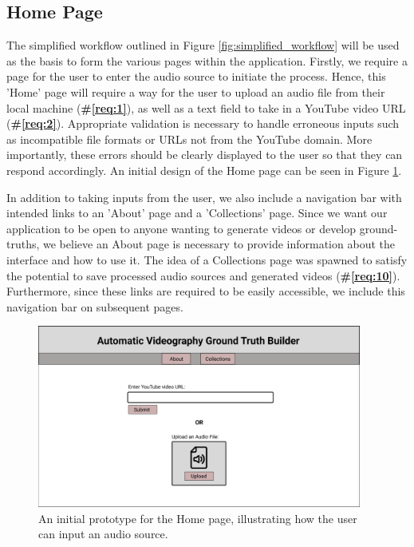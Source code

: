 \documentclass{l4proj}
\begin{document}
\subsection{Home Page}
The simplified workflow outlined in Figure \ref{fig:simplified_workflow} will be used as the basis to form the various pages within the application. Firstly, we require a page for the user to enter the audio source to initiate the process. Hence, this 'Home' page will require a way for the user to upload an audio file from their local machine (\textbf{\#\ref{req:1}}), as well as a text field to take in a YouTube video URL (\textbf{\#\ref{req:2}}). Appropriate validation is necessary to handle erroneous inputs such as incompatible file formats or URLs not from the YouTube domain. More importantly, these errors should be clearly displayed to the user so that they can respond accordingly. An initial design of the Home page can be seen in Figure \ref{fig:home_page}. 

In addition to taking inputs from the user, we also include a navigation bar with intended links to an 'About' page and a 'Collections' page. Since we want our application to be open to anyone wanting to generate videos or develop ground-truths, we believe an About page is necessary to provide information about the interface and how to use it. The idea of a Collections page was spawned to satisfy the potential to save processed audio sources and generated videos (\textbf{\#\ref{req:10}}). Furthermore, since these links are required to be easily accessible, we include this navigation bar on subsequent pages.

\begin{figure}
    \centering
    \includegraphics[width=0.95\textwidth]{figures/home_page.pdf}
    \caption{An initial prototype for the Home page, illustrating how the user can input an audio source.}
    \label{fig:home_page}
\end{figure}
\end{document}
